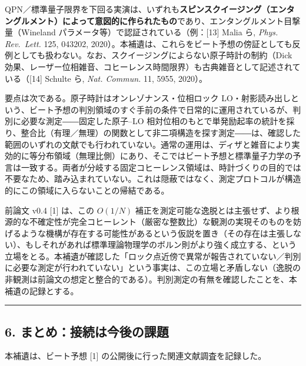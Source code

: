 \documentclass[
]{ltjsarticle}
\begin{document}
QPN／標準量子限界を下回る実演は、いずれも\textbf{スピンスクイージング（エンタングルメント）によって意図的に作られたもの}であり、エンタングルメント目撃量（Wineland
パラメータ等）で認証されている（例：{[}13{]} Malia ら, \emph{Phys.
Rev.~Lett.} 125, 043202,
2020）。本補遺は、これらをビート予想の傍証としても反例としても扱わない。なお、スクイージングによらない原子時計の制約（Dick
効果、レーザー位相雑音、コヒーレンス時間限界）も古典雑音として記述されている（{[}14{]}
Schulte ら, \emph{Nat. Commun.} 11, 5955, 2020）。

要点は次である。原子時計はオンレゾナンス・位相ロック
LO・射影読み出しという、ビート予想の判別領域のすぐ手前の条件で日常的に運用されているが、判別に必要な測定――固定した原子--LO
相対位相のもとで単発励起率の統計を採り、整合比（有理／無理）の関数として非二項構造を探す測定――は、確認した範囲のいずれの文献でも行われていない。通常の運用は、ディザと雑音により実効的に等分布領域（無理比側）にあり、そこではビート予想と標準量子力学の予言は一致する。両者が分岐する固定コヒーレンス領域は、時計づくりの目的では不要なため、踏み込まれていない。これは隠蔽ではなく、測定プロトコルが構造的にこの領域に入らないことの帰結である。

前論文 v0.4 {[}1{]} は、この \(O(1/N)\)
補正を測定可能な逸脱とは主張せず、より根源的な不確定性が完全コヒーレント（厳密な整数比）な観測の実現そのものを妨げるような機構が存在する可能性があるという仮説を置き（その存在は主張しない）、もしそれがあれば標準理論物理学のボルン則がより強く成立する、という立場をとる。本補遺が確認した「ロック点近傍で異常が報告されていない／判別に必要な測定が行われていない」という事実は、この立場と矛盾しない（逸脱の非観測は前論文の想定と整合的である）。判別測定の有無を確認したことを、本補遺の記録とする。

\begin{center}\rule{0.5\linewidth}{0.5pt}\end{center}

\subsection{6.
まとめ：接続は今後の課題}\label{ux307eux3068ux3081ux63a5ux7d9aux306fux4ecaux5f8cux306eux8ab2ux984c}

本補遺は、ビート予想 {[}1{]} の公開後に行った関連文献調査を記録した。
\end{document}
